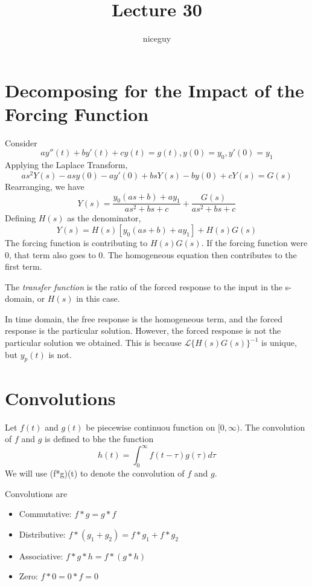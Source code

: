 \documentclass[12pt]{article}
\title{Lecture 30}
\author{niceguy}
\begin{document}
\maketitle

\section{Decomposing for the Impact of the Forcing Function}

Consider
$$ay''(t) + by'(t) + cy(t) = g(t), y(0) = y_0, y'(0) = y_1$$
Applying the Laplace Transform,
$$as^2Y(s) - asy(0) - ay'(0) + bsY(s) - by(0) + cY(s) = G(s)$$
Rearranging, we have
$$Y(s) = \frac{y_0(as+b) + ay_1}{as^2 + bs + c} + \frac{G(s)}{as^2 + bs + c}$$
Defining $H(s)$ as the denominator,
$$Y(s) = H(s)[y_0(as+b)+ay_1] + H(s)G(s)$$
The forcing function is contributing to $H(s)G(s)$. If the forcing function were $0$, that term also goes to $0$. The homogeneous equation then contributes to the first term.

\begin{defn}
	The \emph{transfer function} is the ratio of the forced response to the input in the s-domain, or $H(s)$ in this case.
\end{defn}

In time domain, the free response is the homogeneous term, and the forced response is the particular solution. However, the forced response is not the particular solution we obtained. This is because $\mathcal{L}\{H(s)G(s)\}^{-1}$ is unique, but $y_p(t)$ is not.

\section{Convolutions}

\begin{defn}
	Let $f(t)$ and $g(t)$ be piecewise continuou function on $[0,\infty)$. The convolution of $f$ and $g$ is defined to bhe the function
	$$h(t) = \int_0^\infty f(t-\tau)g(\tau)d\tau$$
	We will use (f*g)(t) to denote the convolution of $f$ and $g$.
\end{defn}

Convolutions are
\begin{itemize}
	\item Commutative: $f*g = g*f$
	\item Distributive: $f*(g_1+g_2) = f*g_1 + f*g_2$
	\item Associative: $f*g*h = f*(g*h)$
	\item Zero: $f*0 = 0*f = 0$
\end{itemize}
\end{document}
